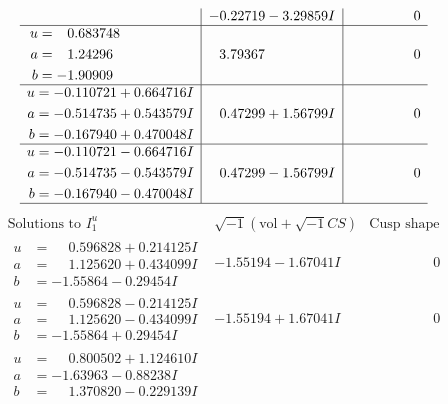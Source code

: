 \documentclass[1p]{elsarticle_modified}
\theoremstyle{definition}
\newcommand{\I}{\sqrt{-1}}
\begin{document}
$$\begin{array}{c|c|c}
 & -0.22719 - 3.29859 I & \phantom{-0.000000 } 0 \\ \hline\begin{aligned}
u &= \phantom{-}0.683748\phantom{ +0.000000I} \\
a &= \phantom{-}1.24296\phantom{ +0.000000I} \\
b &= -1.90909\phantom{ +0.000000I}\end{aligned}
 & \phantom{-}3.79367\phantom{ +0.000000I} & \phantom{-0.000000 } 0 \\ \hline\begin{aligned}
u &= -0.110721 + 0.664716 I \\
a &= -0.514735 + 0.543579 I \\
b &= -0.167940 + 0.470048 I\end{aligned}
 & \phantom{-}0.47299 + 1.56799 I & \phantom{-0.000000 } 0 \\ \hline\begin{aligned}
u &= -0.110721 - 0.664716 I \\
a &= -0.514735 - 0.543579 I \\
b &= -0.167940 - 0.470048 I\end{aligned}
 & \phantom{-}0.47299 - 1.56799 I & \phantom{-0.000000 } 0\\
 \hline 
 \end{array}$$\newpage$$\begin{array}{c|c|c}  
\text{Solutions to }I^u_{1}& \I (\text{vol} + \sqrt{-1}CS) & \text{Cusp shape}\\
 \hline 
\begin{aligned}
u &= \phantom{-}0.596828 + 0.214125 I \\
a &= \phantom{-}1.125620 + 0.434099 I \\
b &= -1.55864 - 0.29454 I\end{aligned}
 & -1.55194 - 1.67041 I & \phantom{-0.000000 } 0 \\ \hline\begin{aligned}
u &= \phantom{-}0.596828 - 0.214125 I \\
a &= \phantom{-}1.125620 - 0.434099 I \\
b &= -1.55864 + 0.29454 I\end{aligned}
 & -1.55194 + 1.67041 I & \phantom{-0.000000 } 0 \\ \hline\begin{aligned}
u &= \phantom{-}0.800502 + 1.124610 I \\
a &= -1.63963 - 0.88238 I \\
b &= \phantom{-}1.370820 - 0.229139 I\end{aligned}

\end{array}$$
\end{document}
